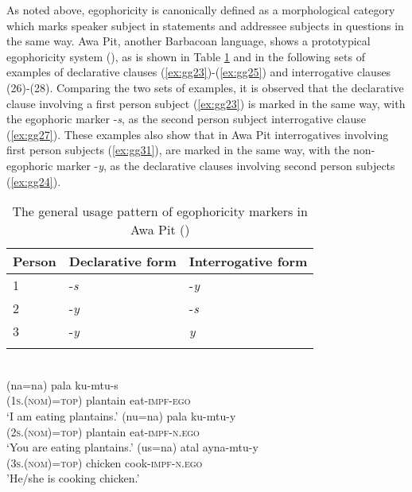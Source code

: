 \documentclass[output=paper]{langsci/langscibook}
\begin{document}
As noted above, egophoricity is canonically defined as a morphological category which marks speaker subject in statements and addressee subjects in questions in the same way. Awa Pit, another Barbacoan language, shows a prototypical egophoricity system (\citealt[613]{Curnow2002a}), as is shown in Table \ref{tab:gg6} and in the following sets of examples of declarative clauses (\ref{ex:gg23})-(\ref{ex:gg25}) and interrogative clauses (26)-(28). Comparing the two sets of examples, it is observed that the declarative clause involving a first person subject (\ref{ex:gg23}) is marked in the same way, with the egophoric marker -\textit{s}, as the second person subject interrogative clause (\ref{ex:gg27}). These examples also show that in Awa Pit interrogatives involving first person subjects (\ref{ex:gg31}),
are marked in the same way, with the non-egophoric marker -\textit{y}, as the declarative clauses involving second person subjects (\ref{ex:gg24}). 

\begin{table}
\begin{tabularx}{\textwidth}{XXX}
\lsptoprule
\textbf{Person} & \textbf{Declarative form} & \textbf{Interrogative form}\\
\midrule
1 & -\textit{s} & -\textit{y}\\
2 & -\textit{y} & -\textit{s}\\
3 & -\textit{y} & \textit{y}\\
\lspbottomrule
\end{tabularx}
\caption{The general usage pattern of egophoricity markers in Awa Pit (\citealt{Curnow2002a})}
\label{tab:gg6}
\end{table}


\ea 
{}\\ 
	\ea \label{ex:gg23}
    \gll (na=na)	pala ku-mtu-s\\
         (1\textsc{s.(nom)=top}) plantain eat-\textsc{impf-ego}\\
    \glt ‘I am eating plantains.’
  \ex \label{ex:gg24}
    \gll (nu=na)	pala ku-mtu-y\\
   	(2\textsc{s.(nom)=top})	plantain	eat-\textsc{impf-n.ego}\\    
   	\glt ‘You are eating plantains.’
   \ex \label{ex:gg25}
   \gll (us=na)	atal	ayna-mtu-y\\
   (3\textsc{s.(nom)=top})	chicken	cook-\textsc{impf-n.ego}\\
   \glt 'He/she is cooking chicken.'
\z \z
\end{document}
